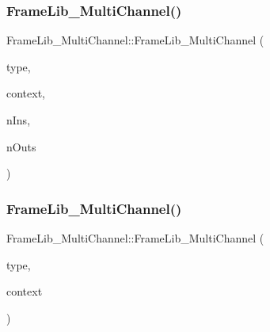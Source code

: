 \subsubsection{\texorpdfstring{Frame\+Lib\+\_\+\+Multi\+Channel()}{FrameLib\_MultiChannel()}\hspace{0.1cm}{\footnotesize\ttfamily [1/2]}}
{\footnotesize\ttfamily Frame\+Lib\+\_\+\+Multi\+Channel\+::\+Frame\+Lib\+\_\+\+Multi\+Channel (\begin{DoxyParamCaption}\item[{\hyperlink{_frame_lib___types_8h_a842c5e2e69277690b064bf363c017980}{Object\+Type}}]{type,  }\item[{\hyperlink{class_frame_lib___context}{Frame\+Lib\+\_\+\+Context}}]{context,  }\item[{unsigned long}]{n\+Ins,  }\item[{unsigned long}]{n\+Outs }\end{DoxyParamCaption})\hspace{0.3cm}{\ttfamily [inline]}}

\mbox{\label{class_frame_lib___multi_channel_aae7ab1c8e9db0c7bc6e26671e1ac4ab4}} 
\subsubsection{\texorpdfstring{Frame\+Lib\+\_\+\+Multi\+Channel()}{FrameLib\_MultiChannel()}\hspace{0.1cm}{\footnotesize\ttfamily [2/2]}}
{\footnotesize\ttfamily Frame\+Lib\+\_\+\+Multi\+Channel\+::\+Frame\+Lib\+\_\+\+Multi\+Channel (\begin{DoxyParamCaption}\item[{\hyperlink{_frame_lib___types_8h_a842c5e2e69277690b064bf363c017980}{Object\+Type}}]{type,  }\item[{\hyperlink{class_frame_lib___context}{Frame\+Lib\+\_\+\+Context}}]{context }\end{DoxyParamCaption})\hspace{0.3cm}{\ttfamily [inline]}}

\mbox{\label{class_frame_lib___multi_channel_ab6c1272cacfc7bf3cad1e2430d4c7020}} 
